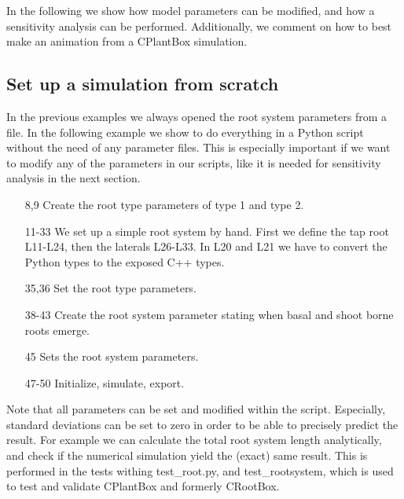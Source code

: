 \documentclass[a4paper]{article}
\begin{document}
In the following we show how model parameters can be modified, and how a sensitivity analysis can be performed. Additionally, we comment on how to best make an animation from a CPlantBox simulation.

\subsection{Set up a simulation from scratch} \label{sec:from_scratch}

In the previous examples we always opened the root system parameters from a file. 
In the following example we show to do everything in a Python script without the need of any parameter files. 
This is especially important if we want to modify any of the parameters in our scripts, like it is needed for sensitivity analysis in the next section. 



\begin{itemize}

\item[8,9] Create the root type parameters of type 1 and type 2.
\item[11-33] We set up a simple root system by hand. First we define the tap root L11-L24, then the laterals L26-L33. In L20 and L21 we have to convert the Python types to the exposed C++ types.
\item[35,36] Set the root type parameters.

\item[38-43] Create the root system parameter stating when basal and shoot borne roots emerge.

\item[45] Sets the root system parameters.

\item[47-50] Initialize, simulate, export. 

\end{itemize}

Note that all parameters can be set and modified within the script. Especially, standard deviations can be set to zero in order to be able to precisely predict the result. For example we can calculate the total root system length analytically, and check if the numerical simulation yield the (exact) same result. This is performed in the tests withing test\_root.py, and test\_rootsystem, which is used to test and validate CPlantBox and formerly CRootBox.
\end{document}
